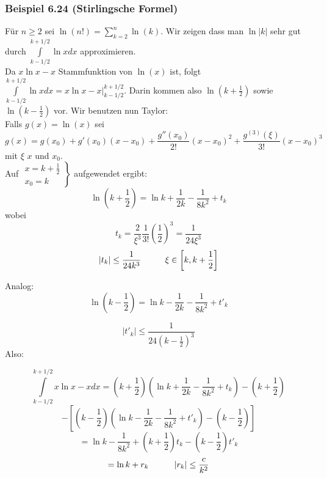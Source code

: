 \subsubsection*{Beispiel 6.24 (Stirlingsche Formel)}
Für $n\geq 2$ sei $\ln (n!) = \sum\limits_{k = 2}^n {\ln (k)} $. Wir zeigen dass man $\ln\left| k\right|$ sehr gut durch $\int\limits_{k - 1/2}^{k + 1/2} {\ln xdx} $ approximieren.\\

Da $x\ln x-x$ Stammfunktion von $\ln(x)$ ist, folgt $\int\limits_{k - 1/2}^{k + 1/2} {\ln xdx}  = \left. {x\ln x - x} \right|_{k - 1/2}^{k + 1/2}$. Darin kommen also $\ln\left(k+\frac{1}{2}\right)$ sowie $\ln\left(k-\frac{1}{2}\right)$ vor. Wir benutzen nun Taylor:\\

Falls $g(x)=\ln(x)$ sei $$g(x)=g(x_0)+g'(x_0)(x-x_0)+\frac{g''(x_0)}{2!}(x-x_0)^2+\frac{g^{(3)}(\xi)}{3!}(x-x_0)^3$$ mit $\xi$  $x$ und $x_0$.\\

Auf $\left. {\begin{array}{*{20}{c}}
{x = k + \frac{1}{2}}\\
{{x_0} = k}
\end{array}} \right\}$ aufgewendet ergibt:
\[\ln \left( {k + \frac{1}{2}} \right) = \ln k + \frac{1}{{2k}} - \frac{1}{{8{k^2}}} + {t_k}\]
wobei $${t_k} = \frac{2}{{{\xi ^3}}}\frac{1}{{3!}}{\left( {\frac{1}{2}} \right)^3} = \frac{1}{{24{\xi ^3}}}$$
\[\left| {{t_k}} \right| \le \frac{1}{{24{k^3}}}\text{\hspace{10mm}}\xi  \in \left[ {k,k + \frac{1}{2}} \right]\]

Analog:
\[\ln \left( {k - \frac{1}{2}} \right) = \ln k - \frac{1}{{2k}} - \frac{1}{{8{k^2}}} + {t'_k}\]

\[\left| {{t'_k}} \right| \le \frac{1}{{24{\left(k-\frac{1}{2}\right)^3}}}\]
Also:

\[\int\limits_{k - 1/2}^{k + 1/2} {x\ln x - xdx = \left( {k + \frac{1}{2}} \right)} \left( {\ln k + \frac{1}{{2k}} - \frac{1}{{8{k^2}}} + {t_k}} \right) - \left( {k + \frac{1}{2}} \right)\]
$$ - \left[ {\left( {k - \frac{1}{2}} \right)\left( {\ln k - \frac{1}{{2k}} - \frac{1}{{8{k^2}}} + t{'_k}} \right) - \left( {k - \frac{1}{2}} \right)} \right]$$
$$ = \ln k - \frac{1}{{8{k^2}}} + \left( {k + \frac{1}{2}} \right){t_k} - \left( {k - \frac{1}{2}} \right)t{'_k}$$
$$ = \ln k + {r_k}\text{\hspace{10mm}}\left| {{r_k}} \right| \le \frac{c}{{{k^2}}}$$


